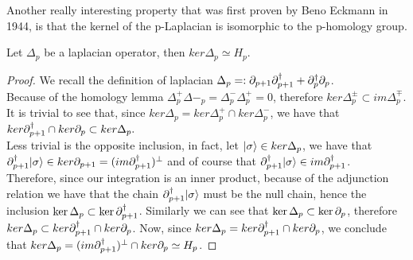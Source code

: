 \documentclass[../1.tex]{subfiles}
\begin{document}
    Another really interesting property that was first proven by Beno Eckmann in 1944, is that the kernel of the p-Laplacian
    is isomorphic to the p-homology group.

    \begin{thm}
        Let $\Delta_p$ be a laplacian operator, then $ker\Delta_p \simeq H_p$.
    \end{thm}
    \begin{proof}
        We recall the definition of laplacian $\Delta_p =: \partial_{p+1}\partial^\dagger_{p+1} + \partial^\dagger_p\partial_p$.\\
        Because of the homology lemma $\Delta^+_p\Delta-_p = \Delta^-_p\Delta^+_p = 0$, therefore $ker\Delta^{\pm}_p \subset im\Delta^{\mp}_p.$\\
        It is trivial to see that, since $ker\Delta_p = ker\Delta^+_p \cap ker\Delta^-_p $, we have that $ker\partial^\dagger_{p+1} \cap ker\partial_p \subset ker\Delta_p.$ \\
        Less trivial is the opposite inclusion, in fact, let $| \sigma \rangle \in ker\Delta_p$, we have that $\partial_{p+1}^\dagger| \sigma \rangle \in ker\partial_{p+1} = (im\partial_{p+1}^\dagger)^\perp$ 
        and of course that $\partial_{p+1}^\dagger| \sigma \rangle \in im\partial_{p+1}^\dagger$.\\
        Therefore, since our integration is an inner product, because of the adjunction relation we have that the chain $\partial_{p+1}^\dagger| \sigma \rangle$ must
        be the null chain, hence the inclusion $\ker\Delta_p \subset \ker\partial_{p+1}^\dagger$. Similarly we can see that $\ker\Delta_p \subset \ker\partial_p$,        
        therefore $ker\Delta_p \subset ker\partial^\dagger_{p+1} \cap ker\partial_p $. Now, since $ker\Delta_p = ker\partial^\dagger_{p+1} \cap ker\partial_p$, we conclude that 
        $ker\Delta_p = (im\partial_{p+1}^\dagger)^\perp \cap ker\partial_p \simeq H_p$. \qedhere
    \end{proof}
\end{document}

